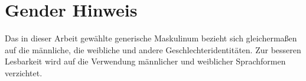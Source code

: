 \chapter*{Gender Hinweis}
\thispagestyle{plain}

Das in dieser Arbeit gewählte generische Maskulinum bezieht sich gleichermaßen auf die männliche, die weibliche und andere Geschlechteridentitäten. Zur besseren Lesbarkeit wird auf die Verwendung männlicher und weiblicher Sprachformen verzichtet. 